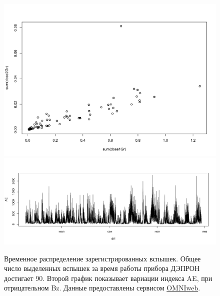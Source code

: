 \begin{figure}[h]
	\centering
	\includegraphics[width=0.7\linewidth, trim={0 2cm 0 0}]{images/Flash/Rplot03}
	\includegraphics[width=0.7\linewidth, trim={0 1.5cm 0 0}]{images/Flash/Rplot01}
	\caption{Временное распределение зарегистрированных вспышек. Общее число выделенных вспышек за время работы прибора ДЭПРОН достигает 90. Второй график показывает вариации индекса AE, при отрицательном Bz. Данные предоставлены сервисом  \href{https://omniweb.gsfc.nasa.gov/}{OMNIweb}.}
	\label{fig:rplot03}
\end{figure}


